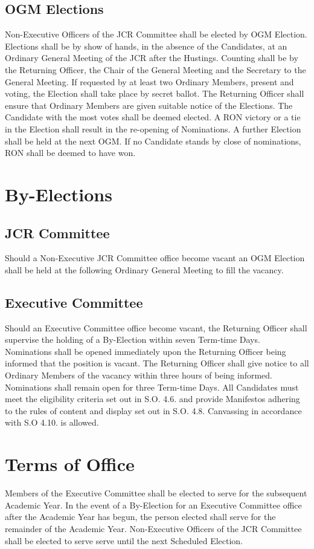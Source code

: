 \subsection{OGM Elections}
\npara Non-Executive Officers of the JCR Committee shall be elected by OGM Election.
\npara Elections shall be by show of hands, in the absence of the Candidates, at an Ordinary General Meeting of the JCR after the Hustings. Counting shall be by the Returning Officer, the Chair of the General Meeting and the Secretary to the General Meeting. If requested by at least two Ordinary Members, present and voting, the Election shall take place by secret ballot.
\npara The Returning Officer shall ensure that Ordinary Members are given suitable notice of the Elections.
\npara The Candidate with the most votes shall be deemed elected.
\npara A RON victory or a tie in the Election shall result in the re-opening of Nominations. A further Election shall be held at the next OGM.
\npara If no Candidate stands by close of nominations, RON shall be deemed to have won.
\section{By-Elections}
\subsection{JCR Committee}
\npara Should a Non-Executive JCR Committee office become vacant an OGM Election shall be held at the following Ordinary General Meeting to fill the vacancy.
\subsection{Executive Committee}
\npara Should an Executive Committee office become vacant, the Returning Officer shall supervise the holding of a By-Election within seven Term-time Days.
\npara Nominations shall be opened immediately upon the Returning Officer being informed that the position is vacant. The Returning Officer shall give notice to all Ordinary Members of the vacancy within three hours of being informed. Nominations shall remain open for three Term-time Days.
\npara All Candidates must meet the eligibility criteria set out in S.O. 4.6. and provide Manifestos adhering to the rules of content and display set out in S.O. 4.8. Canvassing in accordance with S.O 4.10. is allowed.
\section{Terms of Office}
\npara Members of the Executive Committee shall be elected to serve for the subsequent Academic Year.  In the event of a By-Election for an Executive Committee office after the Academic Year has begun, the person elected shall serve for the remainder of the Academic Year.
\npara Non-Executive Officers of the JCR Committee shall be elected to serve serve until the next Scheduled Election.
